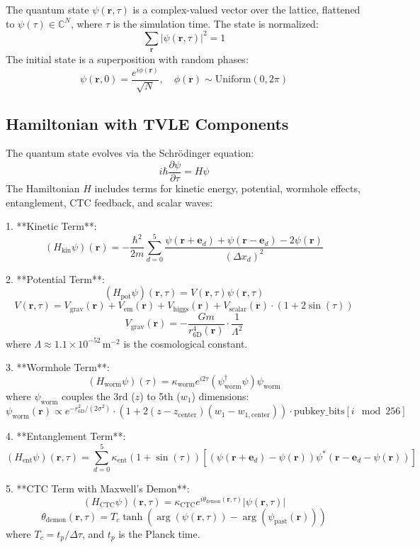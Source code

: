 \documentclass[aps,prl,twocolumn,superscriptaddress]{revtex4-2}
\begin{document}
The quantum state \(\psi(\mathbf{r}, \tau)\) is a complex-valued vector over the lattice, flattened to \(\psi(\tau) \in \mathbb{C}^N\), where \(\tau\) is the simulation time. The state is normalized:
\[
\sum_{\mathbf{r}} |\psi(\mathbf{r}, \tau)|^2 = 1
\]
The initial state is a superposition with random phases:
\[
\psi(\mathbf{r}, 0) = \frac{e^{i \phi(\mathbf{r})}}{\sqrt{N}}, \quad \phi(\mathbf{r}) \sim \text{Uniform}(0, 2\pi)
\]

\subsection{Hamiltonian with TVLE Components}
The quantum state evolves via the Schrödinger equation:
\[
i \hbar \frac{\partial \psi}{\partial \tau} = H \psi
\]
The Hamiltonian \(H\) includes terms for kinetic energy, potential, wormhole effects, entanglement, CTC feedback, and scalar waves:

1. **Kinetic Term**:
\[
(H_{\text{kin}} \psi)(\mathbf{r}) = -\frac{\hbar^2}{2 m} \sum_{d=0}^{5} \frac{\psi(\mathbf{r} + \mathbf{e}_d) + \psi(\mathbf{r} - \mathbf{e}_d) - 2 \psi(\mathbf{r})}{(\Delta x_d)^2}
\]

2. **Potential Term**:
\[
(H_{\text{pot}} \psi)(\mathbf{r}, \tau) = V(\mathbf{r}, \tau) \psi(\mathbf{r}, \tau)
\]
\[
V(\mathbf{r}, \tau) = V_{\text{grav}}(\mathbf{r}) + V_{\text{em}}(\mathbf{r}) + V_{\text{higgs}}(\mathbf{r}) + V_{\text{scalar}}(\mathbf{r}) \cdot (1 + 2 \sin(\tau))
\]
\[
V_{\text{grav}}(\mathbf{r}) = -\frac{G m}{r_{\text{6D}}^4(\mathbf{r})} \cdot \frac{1}{\Lambda^2}
\]
where \(\Lambda \approx 1.1 \times 10^{-52} \, \text{m}^{-2}\) is the cosmological constant.

3. **Wormhole Term**:
\[
(H_{\text{worm}} \psi)(\tau) = \kappa_{\text{worm}} e^{i 2 \tau} (\psi_{\text{worm}}^\dagger \psi) \psi_{\text{worm}}
\]
where \(\psi_{\text{worm}}\) couples the 3rd (\(z\)) to 5th (\(w_1\)) dimensions:
\[
\psi_{\text{worm}}(\mathbf{r}) \propto e^{-r_{\text{6D}}^2 / (2 \sigma^2)} \cdot (1 + 2 (z - z_{\text{center}}) (w_1 - w_{1,\text{center}})) \cdot \text{pubkey_bits}[i \mod 256]
\]

4. **Entanglement Term**:
\[
(H_{\text{ent}} \psi)(\mathbf{r}, \tau) = \sum_{d=0}^{5} \kappa_{\text{ent}} (1 + \sin(\tau)) \left[ (\psi(\mathbf{r} + \mathbf{e}_d) - \psi(\mathbf{r})) \psi^*(\mathbf{r} - \mathbf{e}_d - \psi(\mathbf{r})) \right]
\]

5. **CTC Term with Maxwell’s Demon**:
\[
(H_{\text{CTC}} \psi)(\mathbf{r}, \tau) = \kappa_{\text{CTC}} e^{i \theta_{\text{demon}}(\mathbf{r}, \tau)} |\psi(\mathbf{r}, \tau)|
\]
\[
\theta_{\text{demon}}(\mathbf{r}, \tau) = T_c \tanh(\arg(\psi(\mathbf{r}, \tau)) - \arg(\psi_{\text{past}}(\mathbf{r})))
\]
where \(T_c = t_p / \Delta \tau\), and \(t_p\) is the Planck time.
\end{document}
